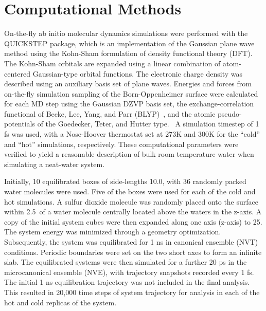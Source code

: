 \section{Computational Methods}

On-the-fly ab initio molecular dynamics simulations were performed with the QUICKSTEP package, which is an implementation of the Gaussian plane wave method using the Kohn-Sham formulation of density functional theory (DFT).~\cite{VandeVondele2005} The Kohn-Sham orbitals are expanded using a linear combination of atom-centered Gaussian-type orbital functions. The electronic charge density was described using an auxiliary basis set of plane waves. Energies and forces from on-the-fly simulation sampling of the Born-Oppenheimer surface were calculated for each MD step using the Gaussian DZVP basis set, the exchange-correlation functional of Becke, Lee, Yang, and Parr (BLYP)~\cite{LEE1988}, and the atomic pseudo-potentials of the Goedecker, Teter, and Hutter type.~\cite{Goedecker1996} A simulation timestep of 1 fs was used, with a Nose-Hoover thermostat set at 273K and 300K for the ``cold'' and ``hot'' simulations, respectively. These computational parameters were verified to yield a reasonable description of bulk room temperature water when simulating a neat-water system. 

Initially, 10 equilibrated boxes of side-lengths 10.0\angs, with 36 randomly packed water molecules were used. Five of the boxes were used for each of the cold and hot simulations. A sulfur dioxide molecule was randomly placed onto the surface within 2.5\angs~of a water molecule centrally located above the waters in the z-axis. A copy of the initial system cubes were then expanded along one axis (z-axis) to 25\angs. The system energy was minimized through a geometry optimization. Subsequently, the system was equilibrated for 1 ns in canonical ensemble (NVT) conditions. Periodic boundaries were set on the two short axes to form an infinite slab. The equilibrated systems were then simulated for a further 20 ps in the microcanonical ensemble (NVE), with trajectory snapshots recorded every 1 fs. The initial 1 ns equilibration trajectory was not included in the final analysis. This resulted in 20,000 time steps of system trajectory for analysis in each of the hot and cold replicas of the system.
 
